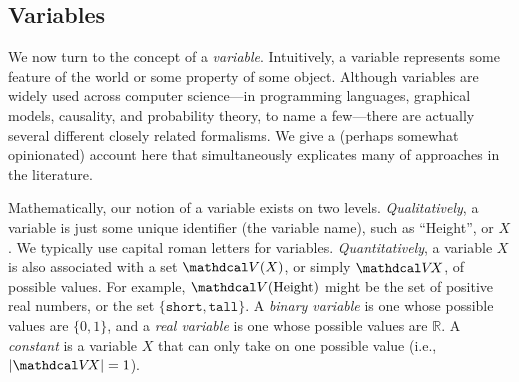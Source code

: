 


\subsection{Variables}
    \label{ssec:basic-vars}
We now turn to the concept of a \emph{variable}.
Intuitively, a variable represents some feature of the world or some property of some object. 
Although variables are widely used across computer science---in programming languages, graphical models, causality, and probability theory, to name a few---there are actually several different closely related formalisms. 
We give a (perhaps somewhat opinionated) account here that simultaneously explicates many of approaches in the literature. 

Mathematically, our notion of a variable exists on two levels.
\emph{Qualitatively}, a variable is just some unique identifier (the variable name), such as ``Height'', or $X$. 
We typically use capital roman letters for variables.
\emph{Quantitatively}, a variable $X$ is also associated with a set $\V(X)$, or simply $\V\!X$, of possible values. 
For example, $\V(\text{Height})$ might be the set of positive real numbers, 
    or the set $\{ \texttt{short}, \texttt{tall} \}$. 
A \emph{binary variable} is one whose possible values are $\{0, 1\}$, and a 
    \emph{real variable} is one whose possible values are $\mathbb R$. 
A \emph{constant} is a variable $X$ that can only take on one possible value (i.e., $|\V\! X| = 1$).

